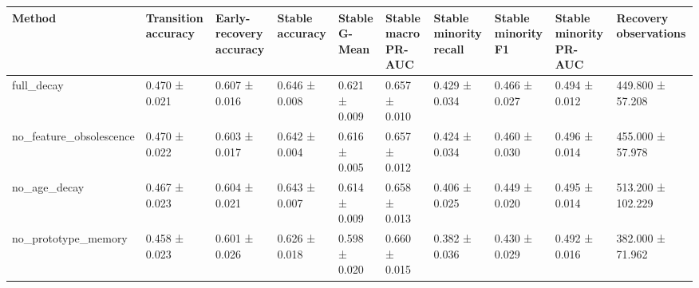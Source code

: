 \begin{tabular}{llllllllll}
\toprule
Method & Transition accuracy & Early-recovery accuracy & Stable accuracy & Stable G-Mean & Stable macro PR-AUC & Stable minority recall & Stable minority F1 & Stable minority PR-AUC & Recovery observations \\
\midrule
full\_decay & 0.470 ± 0.021 & 0.607 ± 0.016 & 0.646 ± 0.008 & 0.621 ± 0.009 & 0.657 ± 0.010 & 0.429 ± 0.034 & 0.466 ± 0.027 & 0.494 ± 0.012 & 449.800 ± 57.208 \\
no\_feature\_obsolescence & 0.470 ± 0.022 & 0.603 ± 0.017 & 0.642 ± 0.004 & 0.616 ± 0.005 & 0.657 ± 0.012 & 0.424 ± 0.034 & 0.460 ± 0.030 & 0.496 ± 0.014 & 455.000 ± 57.978 \\
no\_age\_decay & 0.467 ± 0.023 & 0.604 ± 0.021 & 0.643 ± 0.007 & 0.614 ± 0.009 & 0.658 ± 0.013 & 0.406 ± 0.025 & 0.449 ± 0.020 & 0.495 ± 0.014 & 513.200 ± 102.229 \\
no\_prototype\_memory & 0.458 ± 0.023 & 0.601 ± 0.026 & 0.626 ± 0.018 & 0.598 ± 0.020 & 0.660 ± 0.015 & 0.382 ± 0.036 & 0.430 ± 0.029 & 0.492 ± 0.016 & 382.000 ± 71.962 \\
\bottomrule
\end{tabular}
